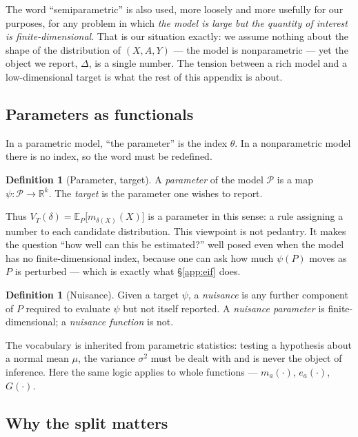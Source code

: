 \documentclass[11pt,a4paper]{article}
\theoremstyle{plain}
\theoremstyle{definition}
\newtheorem{definition}[theorem]{Definition}
\theoremstyle{remark}
\newcommand{\E}{\mathbb E}
\begin{document}
The word ``semiparametric'' is also used, more loosely and more usefully for our purposes, for
any problem in which \emph{the model is large but the quantity of interest is
finite-dimensional}. That is our situation exactly: we assume nothing about the shape of the
distribution of $(X,A,Y)$ --- the model is nonparametric --- yet the object we report,
$\Delta$, is a single number. The tension between a rich model and a low-dimensional target is
what the rest of this appendix is about.

\subsection{Parameters as functionals}

In a parametric model, ``the parameter'' is the index $\theta$. In a nonparametric model there
is no index, so the word must be redefined.

\begin{definition}[Parameter, target]\label{def:functional}
A \emph{parameter} of the model $\mathcal P$ is a map $\psi:\mathcal P\to\mathbb R^k$. The
\emph{target} is the parameter one wishes to report.
\end{definition}

Thus $V_T(\delta)=\E_P\bigl[m_{\delta(X)}(X)\bigr]$ is a parameter in this sense: a rule assigning
a number to each candidate distribution. This viewpoint is not pedantry. It makes the question
``how well can this be estimated?'' well posed even when the model has no finite-dimensional
index, because one can ask how much $\psi(P)$ moves as $P$ is perturbed --- which is exactly
what \S\ref{app:eif} does.

\begin{definition}[Nuisance]\label{def:nuisance}
Given a target $\psi$, a \emph{nuisance} is any further component of $P$ required to evaluate
$\psi$ but not itself reported. A \emph{nuisance parameter} is finite-dimensional; a
\emph{nuisance function} is not.
\end{definition}

The vocabulary is inherited from parametric statistics: testing a hypothesis about a normal
mean $\mu$, the variance $\sigma^2$ must be dealt with and is never the object of inference.
Here the same logic applies to whole functions --- $m_a(\cdot)$, $e_a(\cdot)$, $G(\cdot)$.

\subsection{Why the split matters}\label{app:whysplit}
\end{document}
